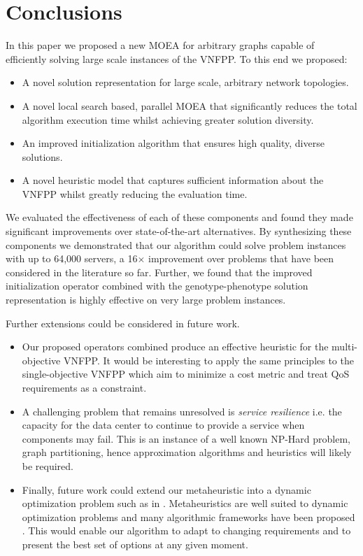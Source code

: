 \section{Conclusions}
\label{sec:conclusion}
In this paper we proposed a new MOEA for arbitrary graphs capable of efficiently solving large scale instances of the VNFPP. To this end we proposed:
\begin{itemize}
    \item A novel solution representation for large scale, arbitrary network topologies.
    \item A novel local search based, parallel MOEA that significantly reduces the total algorithm execution time whilst achieving greater solution diversity.
    \item An improved initialization algorithm that ensures high quality, diverse solutions.
    \item A novel heuristic model that captures sufficient information about the VNFPP whilst greatly reducing the evaluation time.
\end{itemize}
We evaluated the effectiveness of each of these components and found they made significant improvements over state-of-the-art alternatives. By synthesizing these components we demonstrated that our algorithm could solve problem instances with up to 64,000 servers, a 16$\times$ improvement over problems that have been considered in the literature so far. Further, we found that the improved initialization operator combined with the genotype-phenotype solution representation is highly effective on very large problem instances.

Further extensions could be considered in future work. 
\begin{itemize}
    \item Our proposed operators combined produce an effective heuristic for the multi-objective VNFPP. It would be interesting to apply the same principles to the single-objective VNFPP which aim to minimize a cost metric and treat QoS requirements as a constraint.
    \item A challenging problem that remains unresolved is \textit{service resilience} i.e. the capacity for the data center to continue to provide a service when components may fail. This is an instance of a well known NP-Hard problem, graph partitioning, hence approximation algorithms and heuristics will likely be required.
    \item Finally, future work could extend our metaheuristic into a dynamic optimization problem such as in \cite{OtokuraLKKSM16}. Metaheuristics are well suited to dynamic optimization problems and many algorithmic frameworks have been proposed \cite{AlbaNS13}. This would enable our algorithm to adapt to changing requirements and to present the best set of options at any given moment.
\end{itemize}